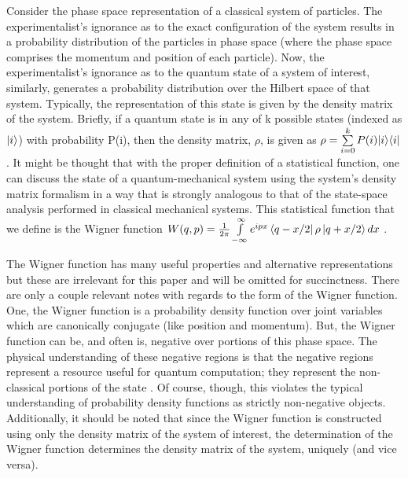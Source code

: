 Consider the phase space representation of a classical system of particles. The experimentalist's ignorance as to the exact configuration of the system results in a probability distribution of the particles in phase space (where the phase space comprises the momentum and position of each particle). Now, the experimentalist's ignorance as to the quantum state of a system of interest, similarly, generates a probability distribution over the Hilbert space of that system. Typically, the representation of this state is given by the density matrix of the system. Briefly, if a quantum state is in any of k possible states (indexed as $\ket{i}$) with probability P(i), then the density matrix, $\rho$, is given as $\rho = \sum\limits_{i=0}^{k} P(i) |i\rangle\langle i|$. It might be thought that with the proper definition of a statistical function, one can discuss the state of a quantum-mechanical system using the system's density matrix formalism in a way that is strongly analogous to that of the state-space analysis performed in classical mechanical systems. This statistical function that we define is the Wigner function $W(q,p)=\frac{1}{2\pi} \int\limits_{-\infty}^\infty e^{ipx} \bra{q-x/2}\rho\ket{q+x/2}dx$ \cite{Ulf}.

The Wigner function has many useful properties and alternative representations but these are irrelevant for this paper and will be omitted for succinctness. There are only a couple relevant notes with regards to the form of the Wigner function. One, the Wigner function is a probability density function over joint variables which are canonically conjugate (like position and momentum). But, the Wigner function can be, and often is, negative over portions of this phase space. The physical understanding of these negative regions is that the negative regions represent a resource useful for quantum computation; they represent the non-classical portions of the state \cite{Ulf}. Of course, though, this violates the typical understanding of probability density functions as strictly non-negative objects. Additionally, it should be noted that since the Wigner function is constructed using only the density matrix of the system of interest, the determination of the Wigner function determines the density matrix of the system, uniquely (and vice versa).

